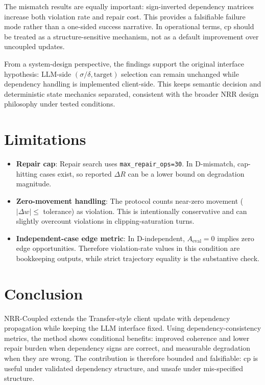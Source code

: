 \documentclass[11pt,a4paper]{article}
\begin{document}
The mismatch results are equally important: sign-inverted dependency matrices increase both violation rate and repair cost. This provides a falsifiable failure mode rather than a one-sided success narrative. In operational terms, cp should be treated as a structure-sensitive mechanism, not as a default improvement over uncoupled updates.

From a system-design perspective, the findings support the original interface hypothesis: LLM-side \((\sigma/\delta,\text{target})\) selection can remain unchanged while dependency handling is implemented client-side. This keeps semantic decision and deterministic state mechanics separated, consistent with the broader NRR design philosophy under tested conditions.

\section{Limitations}
\begin{itemize}
  \item \textbf{Repair cap}: Repair search uses \texttt{max\_repair\_ops=30}. In D-mismatch, cap-hitting cases exist, so reported \(\Delta R\) can be a lower bound on degradation magnitude.
  \item \textbf{Zero-movement handling}: The protocol counts near-zero movement (\(|\Delta w|\le\) tolerance) as violation. This is intentionally conservative and can slightly overcount violations in clipping-saturation turns.
  \item \textbf{Independent-case edge metric}: In D-independent, \(A_{\text{eval}}=0\) implies zero edge opportunities. Therefore violation-rate values in this condition are bookkeeping outputs, while strict trajectory equality is the substantive check.
\end{itemize}

\section{Conclusion}
NRR-Coupled extends the Transfer-style client update with dependency propagation while keeping the LLM interface fixed. Using dependency-consistency metrics, the method shows conditional benefits: improved coherence and lower repair burden when dependency signs are correct, and measurable degradation when they are wrong. The contribution is therefore bounded and falsifiable: cp is useful under validated dependency structure, and unsafe under mis-specified structure.
\end{document}
